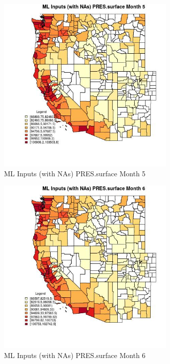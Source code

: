 \clearpage 

\begin{figure} 
\centering  
\includegraphics[width=0.77\textwidth]{Code_Outputs/Report_ML_input_PM25_Step4_part_e_de_duplicated_aves_compiled_2019-05-21wNAs_CountyPRESsurfacemedianMonth5.jpg} 
\caption{\label{fig:Report_ML_input_PM25_Step4_part_e_de_duplicated_aves_compiled_2019-05-21wNAsCountyPRESsurfacemedianMonth5}ML Inputs (with NAs) PRES.surface Month 5} 
\end{figure} 
 

\begin{figure} 
\centering  
\includegraphics[width=0.77\textwidth]{Code_Outputs/Report_ML_input_PM25_Step4_part_e_de_duplicated_aves_compiled_2019-05-21wNAs_CountyPRESsurfacemedianMonth6.jpg} 
\caption{\label{fig:Report_ML_input_PM25_Step4_part_e_de_duplicated_aves_compiled_2019-05-21wNAsCountyPRESsurfacemedianMonth6}ML Inputs (with NAs) PRES.surface Month 6} 
\end{figure} 
 

